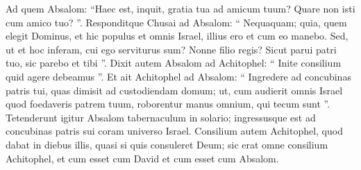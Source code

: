 \begin{biblechapter}
\begin{biblechapter}
\begin{biblechapter}
\begin{biblechapter}
\begin{biblechapter}
\begin{biblechapter}
\begin{biblechapter}
\begin{biblechapter}
\begin{biblechapter}
\begin{biblechapter}
\begin{biblechapter}
\begin{biblechapter}
\begin{biblechapter}
\begin{biblechapter}
\begin{biblechapter}
\begin{biblechapter}
\verse Ad quem Absalom: “Haec est, inquit, gratia tua ad amicum tuum? Quare non isti cum amico tuo? ”. 
 \verse Responditque Chusai ad Absalom: “ Nequaquam; quia, quem elegit Dominus, et hic populus et omnis Israel, illius ero et cum eo manebo. 
\verse Sed, ut et hoc inferam, cui ego serviturus sum? Nonne filio regis? Sicut parui patri tuo, sic parebo et tibi ”.
 \verse Dixit autem Absalom ad Achitophel: “ Inite consilium quid agere debeamus ”. 
 \verse Et ait Achitophel ad Absalom: “ Ingredere ad concubinas patris tui, quas dimisit ad custodiendam domum; ut, cum audierit omnis Israel quod foedaveris patrem tuum, roborentur manus omnium, qui tecum sunt ”. 
\verse Tetenderunt igitur Absalom tabernaculum in solario; ingressusque est ad concubinas patris sui coram universo Israel. 
\verse Consilium autem Achitophel, quod dabat in diebus illis, quasi si quis consuleret Deum; sic erat omne consilium Achitophel, et cum esset cum David et cum esset cum Absalom.
 

\end{biblechapter}
\end{biblechapter}
\end{biblechapter}
\end{biblechapter}
\end{biblechapter}
\end{biblechapter}
\end{biblechapter}
\end{biblechapter}
\end{biblechapter}
\end{biblechapter}
\end{biblechapter}
\end{biblechapter}
\end{biblechapter}
\end{biblechapter}
\end{biblechapter}
\end{biblechapter}
